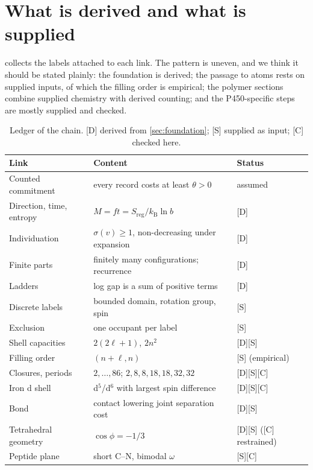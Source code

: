 \documentclass[10pt,twocolumn,a4paper]{article}
\newcommand{\kB}{k_{\mathrm{B}}}
\newcommand{\sep}{\sigma}
\newcommand{\D}{\textsf{[D]}}
\newcommand{\Sup}{\textsf{[S]}}
\newcommand{\C}{\textsf{[C]}}
\begin{document}
\section{What is derived and what is supplied}
\label{sec:ledger}

 collects the labels attached to each link. The pattern is
uneven, and we think it should be stated plainly: the foundation is derived;
the passage to atoms rests on supplied inputs, of which the filling order is
empirical; the polymer sections combine supplied chemistry with derived
counting; and the P450-specific steps are mostly supplied and checked.

\begin{table}[t]
\centering
\small
\caption{Ledger of the chain. \D{} derived from \cref{sec:foundation};
\Sup{} supplied as input; \C{} checked here.}\label{tab:ledger}
\begin{tabular}{@{}p{4.3cm}p{6.3cm}p{2.8cm}@{}}
\toprule
Link & Content & Status\\
\midrule
Counted commitment & every record costs at least $\theta>0$ & assumed\\
Direction, time, entropy & $M=ft=S_{\mathrm{reg}}/\kB\ln b$ & \D\\
Individuation & $\sep(v)\ge1$, non-decreasing under expansion & \D\\
Finite parts & finitely many configurations; recurrence & \D\\
Ladders & log gap is a sum of positive terms & \D\\
Discrete labels & bounded domain, rotation group, spin & \Sup\\
Exclusion & one occupant per label & \Sup\\
Shell capacities & $2(2\ell+1)$, $2n^2$ & \D\Sup\\
Filling order & $(n+\ell,n)$ & \Sup{} (empirical)\\
Closures, periods & $2,\dots,86$; $2,8,8,18,18,32,32$ & \D\Sup\C\\
Iron d shell & d$^5$/d$^6$ with largest spin difference & \D\Sup\C\\
Bond & contact lowering joint separation cost & \D\Sup\\
Tetrahedral geometry & $\cos\phi=-1/3$ & \D\Sup{} (\C{} restrained)\\
Peptide plane & short C--N, bimodal $\omega$ & \Sup\C\\

\end{tabular}
\end{table}
\end{document}
